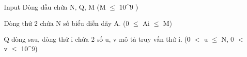 Input
Dòng đầu chứa N, Q, M (M  $\le$  10^9 )

Dòng thứ 2 chứa N số biểu diễn dãy A. (0  $\le$  Ai  $\le$  M)

Q dòng sau, dòng thứ i chứa 2 số u, v mô tả truy vấn thứ i. (0 $<$ u  $\le$  N, 0 $<$ v  $\le$  10^9)